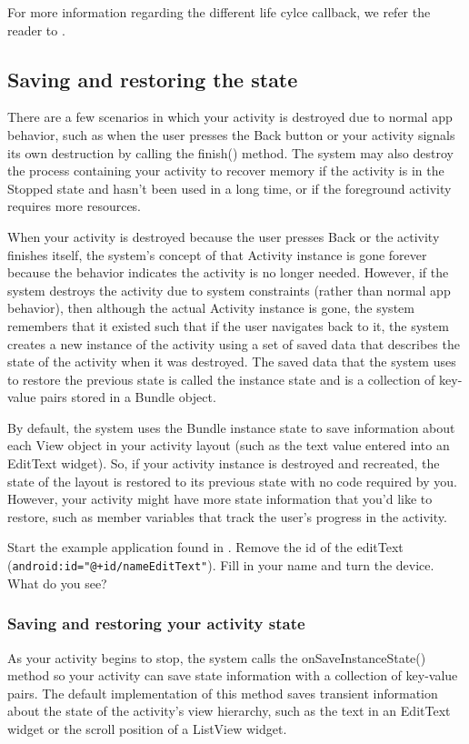 For more information regarding the different life cylce callback, we refer the reader to \cite{Developers19}.

\subsection{Saving and restoring the state}
There are a few scenarios in which your activity is destroyed due to normal app behavior, such as when the user presses the Back button or your activity signals its own destruction by calling the finish() method. The system may also destroy the process containing your activity to recover memory if the activity is in the Stopped state and hasn't been used in a long time, or if the foreground activity requires more resources.

When your activity is destroyed because the user presses Back or the activity finishes itself, the system's concept of that Activity instance is gone forever because the behavior indicates the activity is no longer needed. However, if the system destroys the activity due to system constraints (rather than normal app behavior), then although the actual Activity instance is gone, the system remembers that it existed such that if the user navigates back to it, the system creates a new instance of the activity using a set of saved data that describes the state of the activity when it was destroyed. The saved data that the system uses to restore the previous state is called the instance state and is a collection of key-value pairs stored in a Bundle object.

By default, the system uses the Bundle instance state to save information about each View object in your activity layout (such as the text value entered into an EditText widget). So, if your activity instance is destroyed and recreated, the state of the layout is restored to its previous state with no code required by you. However, your activity might have more state information that you'd like to restore, such as member variables that track the user's progress in the activity.

\begin{exercise}
	Start the example application found in \cite{Buysse19}. Remove the id of the editText (\texttt{android:id="@+id/nameEditText"}). Fill in your name and turn the device. What do you see?
\end{exercise}

\subsubsection{Saving and restoring your activity state}
As your activity begins to stop, the system calls the onSaveInstanceState() method so your activity can save state information with a collection of key-value pairs. The default implementation of this method saves transient information about the state of the activity's view hierarchy, such as the text in an EditText widget or the scroll position of a ListView widget.

